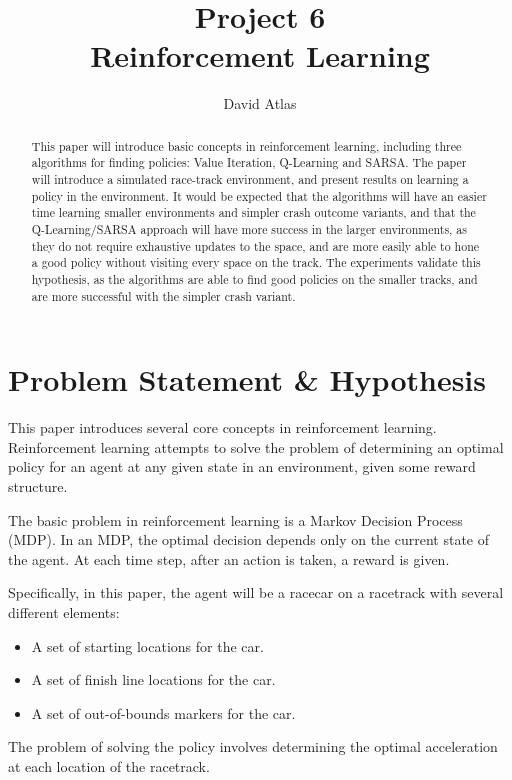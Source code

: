 \documentclass{amsart}
\title{Project 6 \\ Reinforcement Learning}
\author{David Atlas}
\begin{document}
    \begin{abstract}
    This paper will introduce basic concepts in reinforcement
    learning, including three algorithms for finding policies: Value Iteration, Q-Learning and SARSA.
        The paper will introduce a simulated race-track environment, and present results on
        learning a policy in the environment. It would be expected that the algorithms will
        have an easier time learning smaller environments and simpler crash outcome
        variants, and that the Q-Learning/SARSA
        approach will have more success in the larger environments, as they do not
        require exhaustive updates to the space, and are more easily able to hone a good policy
        without visiting every space on the track.
        The experiments validate this hypothesis, as the algorithms are able to find good policies
        on the smaller tracks, and are more successful with the simpler crash variant.
    \end{abstract}
    \maketitle

    \section{Problem Statement \& Hypothesis}
    This paper introduces several core concepts in reinforcement learning. Reinforcement
    learning attempts to solve the problem of determining an optimal policy for an agent at any
    given state in an environment, given some reward structure.

    The basic problem in reinforcement learning is a Markov Decision Process (MDP).
    In an MDP, the optimal decision depends only on the current state of the agent. At each time step,
    after an action is taken, a reward is given.

    Specifically, in this paper, the agent will be a racecar on a racetrack with several different
    elements:
    \begin{itemize}
        \item A set of starting locations for the car.
        \item A set of finish line locations for the car.
        \item A set of out-of-bounds markers for the car.
    \end{itemize}

    The problem of solving the policy involves determining the optimal acceleration at each location of the racetrack.
\end{document}
